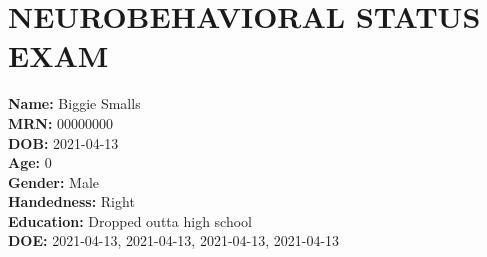 \documentclass[%
numbers=noendperiod,
parskip=half,
bibliography=totoc,
DIV=calc,headsepline=true,
]{scrartcl}
\begin{document}
\hypertarget{neurobehavioral-status-exam}{%
\section{NEUROBEHAVIORAL STATUS EXAM}\label{neurobehavioral-status-exam}}



















\begin{marginfigure}
\textbf{Name:} Biggie Smalls\\
\textbf{MRN:} 00000000\\
\textbf{DOB:} 2021-04-13\\
\textbf{Age:} 0\\
\textbf{Gender:} Male\\
\textbf{Handedness:} Right\\
\textbf{Education:} Dropped outta high school\\
\textbf{DOE:} 2021-04-13, 2021-04-13, 2021-04-13, 2021-04-13
\end{marginfigure}
\end{document}
